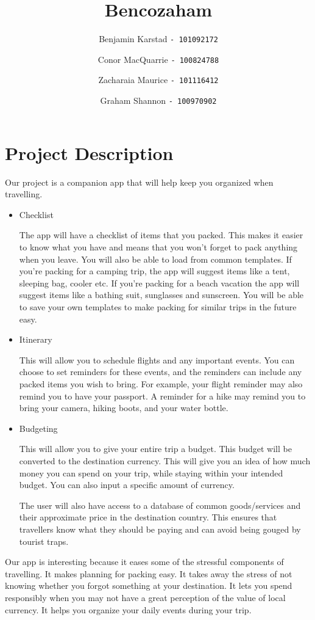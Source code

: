 \documentclass[12pt]{article}
\title{Bencozaham}
\author{
	Benjamin Karstad
	\texttt{- 101092172}
	\and
	Conor MacQuarrie
	\texttt{- 100824788}
	\and
	Zacharaia Maurice
	\texttt{- 101116412}
	\and
	Graham Shannon
	\texttt{- 100970902}
}
\begin{document}
\maketitle

\section*{Project Description}

Our project is a companion app that will help keep you organized when travelling.

\begin{itemize}

	\item{Checklist}

	The app will have a checklist of items that you packed.
	This makes it easier to know what you have and means that you won't forget to pack anything when you leave.
	You will also be able to load from common templates.
	If you're packing for a camping trip, the app will suggest items like a tent, sleeping bag, cooler etc.
	If you're packing for a beach vacation the app will suggest items like a bathing suit, sunglasses and sunscreen.
	You will be able to save your own templates to make packing for similar trips in the future easy.

	\item{Itinerary}

	This will allow you to schedule flights and any important events.
	You can choose to set reminders for these events, and the reminders can include any packed items you wish to bring.
	For example, your flight reminder may also remind you to have your passport.
	A reminder for a hike may remind you to bring your camera, hiking boots, and your water bottle.

	\item{Budgeting}

	This will allow you to give your entire trip a budget.
	This budget will be converted to the destination currency.
	This will give you an idea of how much money you can spend on your trip,
	while staying within your intended budget.
	You can also input a specific amount of currency.

	The user will also have access to a database of common goods/services and their approximate price in the destination country.
	This ensures that travellers know what they should be paying and can avoid being gouged by tourist traps.
\end{itemize}

Our app is interesting because it eases some of the stressful components of travelling.
It makes planning for packing easy.
It takes away the stress of not knowing whether you forgot something at your destination.
It lets you spend responsibly when you may not have a great perception of the value of local currency.
It helps you organize your daily events during your trip.
\end{document}
